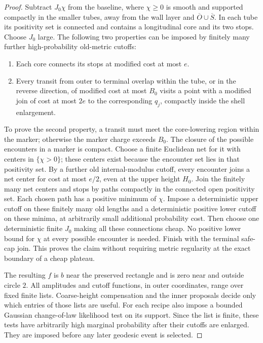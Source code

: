 \begin{proof}
Subtract $J_0\chi$ from the baseline, where $\chi\ge0$ is smooth and
supported compactly in the smaller tubes, away from the wall layer and
$\overline O\cup\overline S$. In each tube its positivity set is connected
and contains a longitudinal core and its two stops. Choose $J_0$ large.
The following two properties can be imposed by finitely many further
high-probability old-metric cutoffs:
\begin{enumerate}
\item Each core connects its stops at modified cost at most $e$.
\item Every transit from outer to terminal overlap within the tube, or
in the reverse direction, of modified cost at most $B_0$ visits a point
with a modified join of cost at most $2e$ to the corresponding $q_j$,
compactly inside the shell enlargement.
\end{enumerate}
To prove the second property, a transit must meet the core-lowering region
within the marker; otherwise the marker charge exceeds $B_0$. The closure of the possible encounters in a marker is compact.
Choose a finite Euclidean net for it with centers in \(\{\chi>0\}\);
these centers exist because the encounter set lies in that positivity
set. By a further old internal-modulus cutoff, every encounter joins a
net center for cost at most \(e/2\), even at the upper height \(H_0\).
Join the finitely many net centers and stops by paths compactly in the
connected open positivity set. Each chosen path has a positive minimum
of \(\chi\). Impose a deterministic upper cutoff on these finitely
many old lengths and a deterministic positive lower cutoff on these
minima, at arbitrarily small additional probability cost. Then choose
one deterministic finite \(J_0\) making all these connections cheap. No positive lower bound
for \(\chi\) at every possible encounter is needed. Finish with the terminal safe-cap join. This proves the
claim without requiring metric regularity at the exact boundary of a
cheap plateau.

The resulting $f$ is $b$ near the preserved rectangle and is zero near and
outside circle $2$. All amplitudes and cutoff functions, in outer
coordinates, range over fixed finite lists. Coarse-height compensation and
the inner proposals decide only which entries of those lists are useful.
For each recipe also impose a bounded Gaussian change-of-law likelihood
test on its support. Since the list is finite, these tests have
arbitrarily high marginal probability after their cutoffs are enlarged.
They are imposed before any later geodesic event is selected.


\end{proof}
